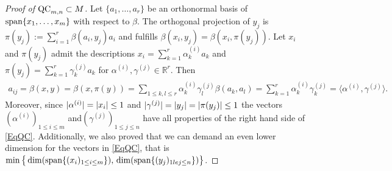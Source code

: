 \begin{proof}[Proof of $ \textup{QC}_{m,n} \subset M $]
	Let $ \{a_1,\hdots,a_r\} $ be an orthonormal basis of $ \textup{span} \{ x_1,\hdots,x_m \} $ with respect to $ \beta $. 
	The orthogonal projection of $ y_j $ is $ \pi(y_j):= \sum_{i=1}^{r}\beta(a_i,y_j)a_i $ and fulfills
	$ \beta(x_i,y_j) = \beta(x_i,\pi(y_j)) $. 
	Let $ x_i $ and $ \pi(y_j) $ admit the descriptions 
	$ x_i = \sum_{k=1}^{r}\alpha_k^{(i)}a_k$ and $  \pi(y_j) = \sum_{k=1}^r \gamma_k^{(j)} a_k$ for $ \alpha^{(i)}, \gamma^{(j)} \in \mathbb{R}^r $. Then
	\begin{align*}
	a_{ij}= \beta(x,y)= \beta(x,\pi(y)) = \sum_{1 \le k,l \le r} \alpha_k^{(i)} \gamma_l^{(j)} \beta(a_k,a_l) = \sum_{k=1}^{r}\alpha_k^{(i)}\gamma_k^{(j)} = \langle \alpha^{(i)}, \gamma^{(j)} \rangle.
	\end{align*}
	Moreover, since $ \vert\alpha^{(i)} \vert= {\left|{x_i}\right|} \le 1$ and $\vert \gamma^{(j)}\vert=  {\left|{y_j}\right|}= {\left|{\pi(y_j)}\right|} \le 1 $ the vectors $ (\alpha^{(i)})_{1 \le i \le m} $ and$ (\gamma^{(j)})_{1 \le j \le n} $ have all properties of the right hand side of \ref{EqQC}.
	Additionally, we also proved that we can demand an even lower dimension for the vectors in \ref{EqQC}, that is  
	$ \min \big \{ \dim( \textup{span} \{ (x_i)_{1 \le i \le m} \}),\, \dim(\textup{span} \{ (y_j)_{1 le j \le n} \} )\big \} $.
\end{proof}

